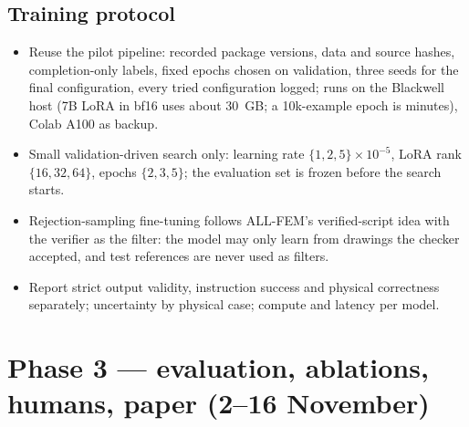 \documentclass[11pt,a4paper]{article}
\newcommand{\code}[1]{\path{#1}}
\begin{document}
\subsection{Training protocol}
\begin{itemize}
  \item Reuse the pilot pipeline: recorded package versions, data and source hashes, completion-only labels, fixed epochs chosen on validation, three seeds for the final configuration, every tried configuration logged; \code{remote_batch.py} runs on the Blackwell host (7B LoRA in bf16 uses about 30~GB; a 10k-example epoch is minutes), Colab A100 as backup.
  \item Small validation-driven search only: learning rate $\{1,2,5\}\times10^{-5}$, LoRA rank $\{16,32,64\}$, epochs $\{2,3,5\}$; the evaluation set is frozen before the search starts.
  \item Rejection-sampling fine-tuning follows ALL-FEM's verified-script idea with the verifier as the filter: the model may only learn from drawings the checker accepted, and test references are never used as filters.
  \item Report strict output validity, instruction success and physical correctness separately; uncertainty by physical case; compute and latency per model.
\end{itemize}

\section{Phase 3 --- evaluation, ablations, humans, paper (2--16 November)}
\end{document}
